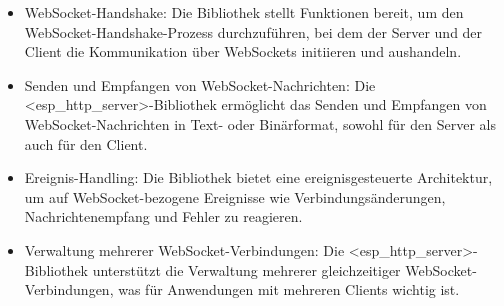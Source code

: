 \begin{itemize}
    \item WebSocket-Handshake: Die Bibliothek stellt Funktionen bereit, um den WebSocket-Handshake-Prozess durchzuführen, bei dem der Server und der Client 
    \newline die Kommunikation über WebSockets initiieren und aushandeln.
    \item Senden und Empfangen von WebSocket-Nachrichten: Die <esp\_http\_server>-Bibliothek ermöglicht das Senden und Empfangen von WebSocket-Nachrichten in Text- oder Binärformat, sowohl für den Server als auch für den Client.
    \item Ereignis-Handling: Die Bibliothek bietet eine ereignisgesteuerte Architektur, um auf WebSocket-bezogene Ereignisse wie Verbindungsänderungen, Nachrichtenempfang und Fehler zu reagieren.
    \item Verwaltung mehrerer WebSocket-Verbindungen: Die <esp\_http\_server>-Bibliothek unterstützt die Verwaltung mehrerer gleichzeitiger WebSocket-Verbindungen, was für Anwendungen mit mehreren Clients wichtig ist.
\end{itemize}

